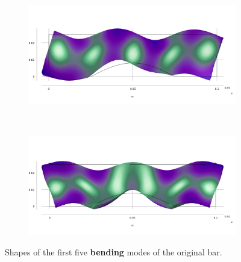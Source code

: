 \documentclass[a4paper]{article}
\begin{document}
\begin{figure}[h]
	\begin{subfigure}{0.3\linewidth}
		\centering
		\includegraphics[width=0.95\linewidth]{04b.png}
	\end{subfigure}
	~
	\begin{subfigure}{0.3\linewidth}
		\centering
		\includegraphics[width=0.95\linewidth]{05b.png}
	\end{subfigure}
	
	\caption{Shapes of the first five \textbf{bending} modes of the original bar.}
	\label{fig:bendSquare}
\end{figure}
\end{document}
